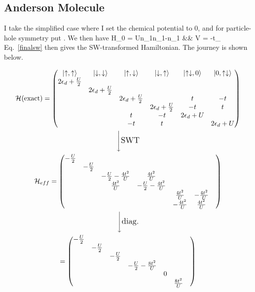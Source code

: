 \documentclass[12pt]{article}
\begin{document}
\subsection{Anderson Molecule}
I take the simplified case where I set the chemical potential  to 0, and for particle-hole symmetry put . We then have
\beq
H_0 = Un_{1\ua}n_{1\da}-n_1 && V = -t\sum_\sigma{}
\eeq
Eq.~\ref{finalsw} then gives the SW-transformed Hamiltonian. The journey is shown below.

\begin{gather}
	\mathcal{H}(\text{exact}) = \begin{pmatrix}\ket{\uparrow,\uparrow} &\ket{\downarrow,\downarrow} &\ket{\uparrow,\downarrow} & \ket{\downarrow,\uparrow} &\ket{\uparrow\downarrow,0} &\ket{0,\uparrow\downarrow} \\ 
	2\epsilon_d+\frac{U}{2} &&&&& \\
	& 2\epsilon_d+\frac{U}{2} &&&&\\
	&& 2\epsilon_d+\frac{U}{2} && t & -t \\ 
	&&& 2\epsilon_d+\frac{U}{2} & -t & t \\
	&& t & -t & 2\epsilon_d+U & \\
	&& -t & t && 2\epsilon_d+U 
	\end{pmatrix}\\
	\Bigg\downarrow {\large{\text{SWT}}}\\
	\mathcal{H}_{eff} = \begin{pmatrix} 
	-\frac{U}{2} &&&&& \\ 
	& -\frac{U}{2} &&&&\\
	&& -\frac{U}{2} -\frac{4t^2}{U} & \frac{4t^2}{U} &&& \\ 
	&& \frac{4t^2}{U} & -\frac{U}{2}-\frac{4t^2}{U} &&& \\
	&&&& \frac{4t^2}{U} & -\frac{4t^2}{U} \\
	&&&& -\frac{4t^2}{U} & \frac{4t^2}{U}
	\end{pmatrix}\\
	\Bigg\downarrow {\large{\text{diag.}}}\\ 
	 = \begin{pmatrix}-\frac{U}{2} &&&&& \\ 
	 & -\frac{U}{2} &&&&\\
	 && -\frac{U}{2} &&&& \\ 
	 &&& -\frac{U}{2}-\frac{8t^2}{U} &&& \\
	 &&&& 0 & \\
	 &&&&& \frac{8t^2}{U}
	 \end{pmatrix}
\end{gather}
\end{document}
